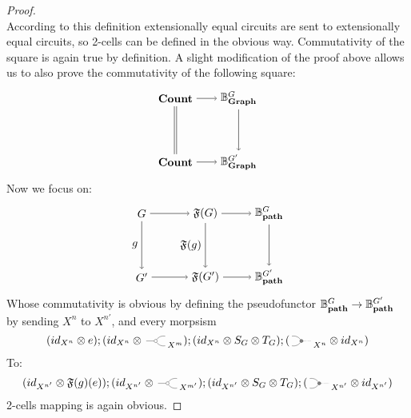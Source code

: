 \begin{proof}
{\begin{equation*}
  \end{equation*}}
  According to this definition extensionally equal circuits 
  are sent to extensionally equal circuits, so 2-cells can be 
  defined in the obvious way. Commutativity of the square 
  is again true by definition. A slight modification of the 
  proof above allows us to also prove the commutativity
  of the following square:
  \begin{equation*}
    \begin{tikzpicture}
      \node (Count) at (0,2) {$\Count$};
      \node (Count') at (0,0) {$\Count$};
      \node (Bzkp) at (2,2) {$\Bgraph{G}$}; 
      \node (Bzkp') at (2,0) {$\Bgraph{G'}$}; 
      \draw[->] (Count) -- (Bzkp);
      \draw[->] (Count') -- (Bzkp');
      \draw[->] (Bzkp) -- (Bzkp');
      \draw[transform canvas={xshift=-1pt}, -] (Count) -- (Count');
      \draw[transform canvas={xshift=1pt}, -] (Count) -- (Count');
    \end{tikzpicture}
  \end{equation*}
  Now we focus on:
  \begin{equation*}
    \begin{tikzpicture}
      \node (G') at (-2,0) {$G'$}; 
      \node (G) at (-2,2) {$G$};
      \node (FG') at (0,0) {$\Free{G'}$}; 
      \node (FG) at (0,2) {$\Free{G}$};
      \node (Bpath') at (2,0) {$\Bpath{G'}$};
      \node (Bpath) at (2,2) {$\Bpath{G}$};
      \draw[->] (G) -- node[left] {$g$} (G');
      \draw[->] (G) -- (FG);
      \draw[->] (G') -- (FG');
      \draw[->] (FG) -- node[left] {$\Free{g}$} (FG');
      \draw[->] (FG) -- (Bpath);
      \draw[->] (FG') -- (Bpath');
      \draw[->] (Bpath) -- (Bpath');
    \end{tikzpicture}
  \end{equation*}
  Whose commutativity is obvious by defining the 
  pseudofunctor $\mathbb{B}^{G}_{\textbf{path}} \to \mathbb{B}^{G'}_{\textbf{path}}$ by sending 
  $X^n$ to $X^{n'}$, and every morpsism
  \begin{equation*}
    (\Id{X^n} \Tensor e);(\Id{X^n} \Tensor \COPYSym_{X^m});
    (\Id{X^n} \Tensor S_G \Tensor T_G);(\MATCHSym_{X^n} \Tensor \Id{X^n})
  \end{equation*}
  To:
  \begin{equation*}
    (\Id{X^{n'}} \Tensor \Free{g}(e));(\Id{X^{n'}} \Tensor \COPYSym_{X^{m'}});
    (\Id{X^{n'}} \Tensor S_G \Tensor T_G);(\MATCHSym_{X^{n'}} \Tensor \Id{X^{n'}})
  \end{equation*}
  2-cells mapping is again obvious.


\end{proof}
